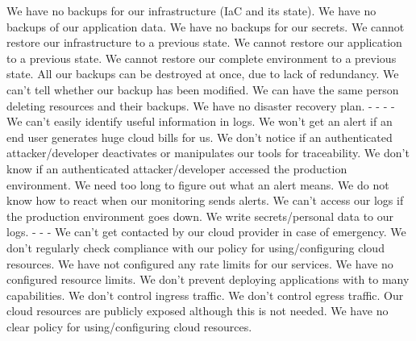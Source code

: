  {We have no backups for our infrastructure (IaC and its state).}
 {We have no backups of our application data.}
 {We have no backups for our secrets.}
 {We cannot restore our infrastructure to a previous state.}
 {We cannot restore our application to a previous state.}
 {We cannot restore our complete environment to a previous state.}
 {All our backups can be destroyed at once, due to lack of redundancy.}
 {We can't tell whether our backup has been modified.}
 {We can have the same person deleting resources and their backups.}
 {We have no disaster recovery plan.}
%
 {-}
 {-}
 {-}
 {-}
 {We can't easily identify useful information in logs.}
 {We won't get an alert if an end user generates huge cloud bills for us.}
 {We don't notice if an authenticated attacker/developer deactivates or manipulates our tools for traceability.}
 {We don't know if an authenticated attacker/developer accessed the production environment.}
 {We need too long to figure out what an alert means.}
 {We do not know how to react when our monitoring sends alerts.}
 {We can't access our logs if the production environment goes down.}
 {We write secrets/personal data to our logs.}
%
 {-}
 {-}
 {-}
 {We can't get contacted by our cloud provider in case of emergency.}
 {We don't regularly check compliance with our policy for using/configuring cloud resources.}
 {We have not configured any rate limits for our services.}
 {We have no configured resource limits.}
 {We don't prevent deploying applications with to many capabilities.}
 {We don't control ingress traffic.}
 {We don't control egress traffic.}
 {Our cloud resources are publicly exposed although this is not needed.}
 {We have no clear policy for using/configuring cloud resources.}
